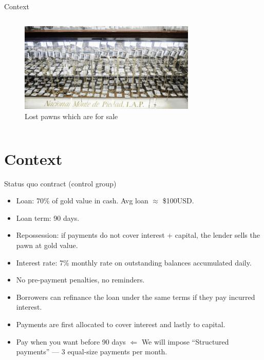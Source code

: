 \documentclass[9pt, aspectratio=169]{beamer}
\begin{document}
\begin{frame}{Context}
\begin{columns}
\begin{column}{.45\textwidth}
\begin{figure}[H]
\begin{center}
    \end{center}
    \end{figure}
\begin{figure}[H]
    \begin{center}
    \caption{Lost pawns which are for sale}
        \includegraphics[width=0.75\textwidth]{Figuras/empenio3_.png}
    \end{center}
    \end{figure}    
    \end{column}    
    \end{columns}
\end{frame}




\section{Context}

\begin{frame}{Status quo contract (control group)}

\begin{itemize}
    \item Loan: 70\% of gold value in cash. Avg loan $\approx$ \$100USD.
    \item Loan term:  90 days.
    \item Repossession: if payments do not cover interest + capital, the lender sells the pawn at gold value.
    \item Interest rate: 7\% monthly rate on outstanding balances accumulated daily.
    \item No pre-payment penalties, no reminders.
    \item Borrowers can refinance the loan under the same terms if they pay incurred interest.
    \item Payments are first allocated to cover interest and lastly to capital.
    \item \alert{Pay when you want} before 90 days $\Leftarrow$ \pause We will impose ``Structured payments'' --- 3 equal-size payments per month.
\end{itemize}
    
\end{frame}
\end{document}
